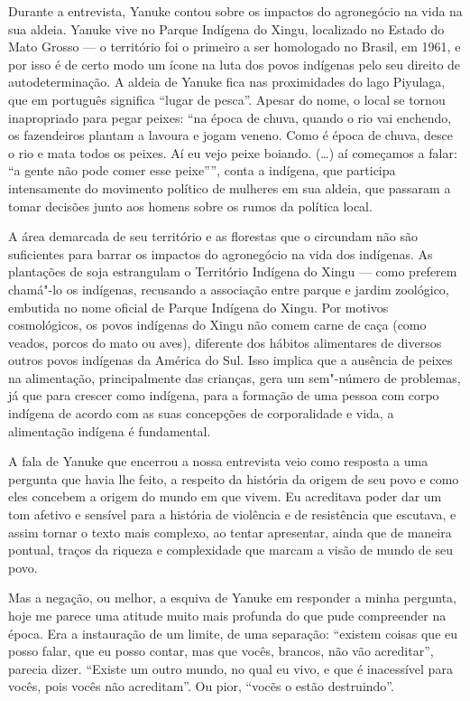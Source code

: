 Durante a entrevista, Yanuke contou sobre os impactos do agronegócio na
vida na sua aldeia. Yanuke vive no Parque Indígena do Xingu, localizado
no Estado do Mato Grosso --- o território foi o primeiro a ser homologado
no Brasil, em 1961, e por isso é de certo modo um ícone na luta dos
povos indígenas pelo seu direito de autodeterminação. A aldeia de Yanuke
fica nas proximidades do lago Piyulaga, que em português significa
``lugar de pesca''. Apesar do nome, o local se tornou inapropriado para
pegar peixes: ``na época de chuva, quando o rio vai enchendo, os
fazendeiros plantam a lavoura e jogam veneno. Como é época de chuva,
desce o rio e mata todos os peixes. Aí eu vejo peixe boiando. (\ldots{}) aí
começamos a falar: ``a gente não pode comer esse peixe'''', conta a
indígena, que participa intensamente do movimento político de mulheres
em sua aldeia, que passaram a tomar decisões junto aos homens sobre os
rumos da política local.

A área demarcada de seu território e as florestas que o circundam não
são suficientes para barrar os impactos do agronegócio na vida dos
indígenas. As plantações de soja estrangulam o Território Indígena do
Xingu --- como preferem chamá"-lo os indígenas, recusando a associação
entre parque e jardim zoológico, embutida no nome oficial de Parque
Indígena do Xingu. Por motivos cosmológicos, os povos indígenas do Xingu
não comem carne de caça (como veados, porcos do mato ou aves), diferente
dos hábitos alimentares de diversos outros povos indígenas da América do
Sul. Isso implica que a ausência de peixes na alimentação,
principalmente das crianças, gera um sem"-número de problemas, já que
para crescer como indígena, para a formação de uma pessoa com corpo
indígena de acordo com as suas concepções de corporalidade e vida, a
alimentação indígena é fundamental.

A fala de Yanuke que encerrou a nossa entrevista veio como resposta a
uma pergunta que havia lhe feito, a respeito da história da origem de
seu povo e como eles concebem a origem do mundo em que vivem. Eu
acreditava poder dar um tom afetivo e sensível para a história de
violência e de resistência que escutava, e assim tornar o texto mais
complexo, ao tentar apresentar, ainda que de maneira pontual, traços da
riqueza e complexidade que marcam a visão de mundo de seu povo.

Mas a negação, ou melhor, a esquiva de Yanuke em responder a minha
pergunta, hoje me parece uma atitude muito mais profunda do que pude
compreender na época. Era a instauração de um limite, de uma separação:
``existem coisas que eu posso falar, que eu posso contar, mas que vocês,
brancos, não vão acreditar'', parecia dizer. ``Existe um outro mundo, no
qual eu vivo, e que é inacessível para vocês, pois vocês não
acreditam''. Ou pior, ``vocẽs o estão destruindo''.

